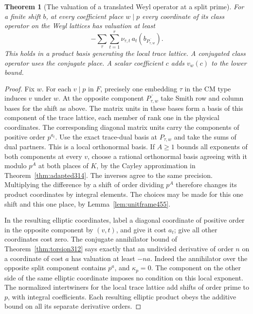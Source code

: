 \documentclass[a4paper,11pt]{article}
\newtheorem{theorem}[proposition]{Theorem}
\theoremstyle{definition}
\theoremstyle{remark}
\numberwithin{equation}{section}
\begin{document}
\begin{theorem}[The valuation of a translated Weyl operator at a split prime]\leavevmode
\label{thm:matrixshift456}
For a finite shift \(b\), at every coefficient place \(w\mid p\)
every coordinate of its class operator on the Weyl lattices
has valuation at least
\[
                 -\sum_\tau\sum_{t=1}^r
                    \nu_{\tau,t}\,a_t(b_{\overline{P_{\tau,w}}}).
\]
This holds in a product basis generating the local trace
lattice. A conjugated class operator uses the conjugate
place. A scalar coefficient \(c\) adds \(v_w(c)\) to the
lower bound.
\end{theorem}
\begin{proof}
Fix \(w\). For each \(v\mid p\) in \(F\), precisely one
embedding \(\tau\) in the CM type induces \(v\) under \(w\).
At the opposite component \(\overline{P_{\tau,w}}\) take
Smith row and column bases for the shift as above. The matrix
units in these bases form a basis of this component of the
trace lattice, each member of rank one in the physical
coordinates. The corresponding diagonal matrix units carry
the components of positive order \(p^{a_t}\). Use the exact
trace-dual basis at \(P_{\tau,w}\) and take the sums of dual
partners. This is a local orthonormal basis. If \(A\ge1\)
bounds all exponents of both components at every \(v\), choose
a rational orthonormal basis agreeing with it modulo \(p^A\)
at both places of \(K\), by the Cayley approximation in
Theorem~\ref{thm:adapted314}. The inverses agree to the same
precision. Multiplying the difference by a shift of order
dividing \(p^A\) therefore changes its product coordinates
by integral elements. The choices may be made for this one
shift and this one place, by Lemma~\ref{lem:unitframe455}.

In the resulting elliptic coordinates, label a diagonal
coordinate of positive order in the opposite component
by \((v,t)\), and give it cost \(a_t\); give all other
coordinates cost zero. The conjugate annihilator bound of
Theorem~\ref{thm:torsion312} says exactly that an undivided
derivative of order \(n\) on a coordinate of cost \(a\)
has valuation at least \(-na\). Indeed the annihilator over
the opposite split component contains \(p^a\), and
\(\kappa_p=0\). The component on the other side of the same
elliptic coordinate imposes no condition on this local
exponent. The normalized intertwiners for the local trace
lattice add shifts of order prime to \(p\), with integral
coefficients. Each resulting elliptic product obeys the
additive bound on all its separate derivative orders.


\end{proof}
\end{document}
